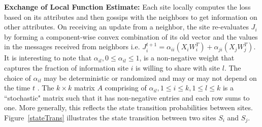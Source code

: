 



\noindent \textbf{Exchange of Local Function Estimate:}  Each site locally computes the loss based on its attributes and then gossips with the neighbors to get information on other attributes.
On receiving an update from a neighbor, the site re-evaluates $J_i$ by forming a component-wise convex combination of its old vector and the values in the messages received from neighbors i.e.   
 $J_i^{t+1}=\alpha_{ii}(X_i W_i^T) + \alpha_{ji} (X_j W_j^T)$. 
It is interesting to note that $\alpha_{il}, 0 \le \alpha_{il} \le 1$, is a non-negative weight that captures the fraction of information site $i$ is willing to share with site $l$. The choice of $\alpha_{il}$ may be deterministic or randomized and may or may not depend on the time $t$ \cite{Kempe_03}. The $k\times k$ matrix $A$ comprising of $\alpha_{il}, 1 \le i \le k, 1 \le l \le k$ is a ``stochastic" matrix such that it has non-negative entries and each row sums to one. More generally, this reflects the state transition probabilities between sites. Figure~\ref{stateTrans} illustrates the state transition between two sites $S_i$ and $S_j$. 

